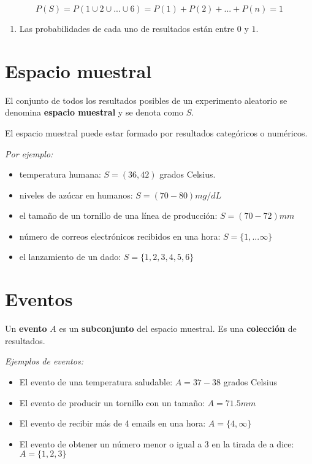 \documentclass[
]{book}
\providecommand{\tightlist}{%
  \setlength{\itemsep}{0pt}\setlength{\parskip}{0pt}}
\begin{document}
\[P(S)=P(1\cup 2\cup ... \cup 6) = P(1)+P(2)+ ...+P(n)=1\]

\begin{enumerate}
\def\labelenumi{\arabic{enumi})}
\setcounter{enumi}{2}
\tightlist
\item
  Las probabilidades de cada uno de resultados están entre \(0\) y \(1\).
\end{enumerate}

\hypertarget{espacio-muestral}{%
\section{Espacio muestral}\label{espacio-muestral}}

El conjunto de todos los resultados posibles de un experimento aleatorio se denomina \textbf{espacio muestral} y se denota como \(S\).

El espacio muestral puede estar formado por resultados categóricos o numéricos.

\emph{Por ejemplo:}

\begin{itemize}
\tightlist
\item
  temperatura humana: \(S = (36, 42)\) grados Celsius.
\item
  niveles de azúcar en humanos: \(S=(70-80) mg/dL\)
\item
  el tamaño de un tornillo de una línea de producción: \(S=(70-72) mm\)
\item
  número de correos electrónicos recibidos en una hora: \(S =\{1, ...\infty \}\)
\item
  el lanzamiento de un dado: \(S=\{1, 2, 3, 4, 5, 6\}\)
\end{itemize}

\hypertarget{eventos}{%
\section{Eventos}\label{eventos}}

Un \textbf{evento} \(A\) es un \textbf{subconjunto} del espacio muestral. Es una \textbf{colección} de resultados.

\emph{Ejemplos de eventos:}

\begin{itemize}
\tightlist
\item
  El evento de una temperatura saludable: \(A=37-38\) grados Celsius
\item
  El evento de producir un tornillo con un tamaño: \(A=71.5mm\)
\item
  El evento de recibir más de 4 emails en una hora: \(A=\{4, \infty \}\)
\item
  El evento de obtener un número menor o igual a 3 en la tirada de a dice: \(A=\{1,2,3\}\)
\end{itemize}
\end{document}
